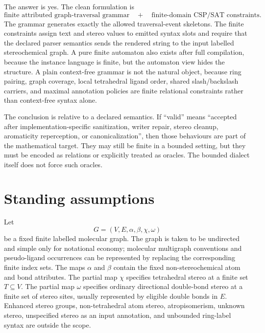 \documentclass[10pt,a4paper]{article}
\theoremstyle{definition}
\theoremstyle{remark}
\begin{document}
	The answer is yes.  The clean formulation is
	\[
	\text{finite attributed graph-traversal grammar}
	\quad + \quad
	\text{finite-domain CSP/SAT constraints} .
	\]
	The grammar generates exactly the allowed traversal-event skeletons.  The finite
	constraints assign text and stereo values to emitted syntax slots and require
	that the declared parser semantics sends the rendered string to the input
	labelled stereochemical graph.  A pure finite automaton also exists after full
	compilation, because the instance language is finite, but the automaton view
	hides the structure.  A plain context-free grammar is not the natural object,
	because ring pairing, graph coverage, local tetrahedral ligand order, shared
	slash/backslash carriers, and maximal annotation policies are finite relational
	constraints rather than context-free syntax alone.

	The conclusion is relative to a declared semantics.  If ``valid'' means
	``accepted after implementation-specific sanitization, writer repair, stereo
	cleanup, aromaticity reperception, or canonicalization'', then those behaviours
	are part of the mathematical target.  They may still be finite in a bounded
	setting, but they must be encoded as relations or explicitly treated as oracles.
	The bounded dialect itself does not force such oracles.

	\section{Standing assumptions}
	\label{s:assumptions}

	Let
	\[
	G=(V,E,\alpha,\beta,\chi,\omega)
	\]
	be a fixed finite labelled molecular graph.  The graph is taken to be undirected
	and simple only for notational economy; molecular multigraph conventions and
	pseudo-ligand occurrences can be represented by replacing the corresponding
	finite index sets.  The maps \(\alpha\) and \(\beta\) contain the fixed
	non-stereochemical atom and bond attributes.  The partial map \(\chi\) specifies
	tetrahedral stereo at a finite set \(T\subseteq V\).  The partial map \(\omega\)
	specifies ordinary directional double-bond stereo at a finite set of stereo
	sites, usually represented by eligible double bonds in \(E\).  Enhanced stereo
	groups, non-tetrahedral atom stereo, atropisomerism, unknown stereo,
	unspecified stereo as an input annotation, and unbounded ring-label syntax are
	outside the scope.
\end{document}

